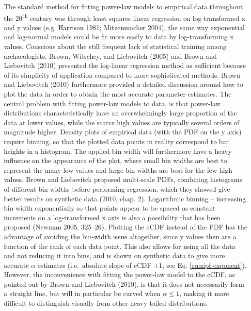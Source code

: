 \documentclass[
  12pt,
  a4paper, twoside]{book}
\begin{document}
The standard method for fitting power-law models to empirical data throughout the 20\textsuperscript{th} century was through least squares linear regression on log-transformed x and y values (e.g. Harrison 1981; Mitzenmacher 2004), the same way exponential and log-normal models could be fit more easily to data by log-transforming x values. Conscious about the still frequent lack of statistical training among archaeologists, Brown, Witschey, and Liebovitch (2005) and Brown and Liebovitch (2010) presented the log-linear regression method as sufficient because of its simplicity of application compared to more sophisticated methods. Brown and Liebovitch (2010) furthermore provided a detailed discussion around how to plot the data in order to obtain the most accurate parameter estimates. The central problem with fitting power-law models to data, is that power-law distributions characteristically have an overwhelmingly large proportion of the data at lower values, while the scarce high values are typically several orders of magnitude higher. Density plots of empirical data (with the PDF on the y axis) require binning, so that the plotted data points in reality correspond to bar heights in a histogram. The applied bin width will furthermore have a heavy influence on the appearance of the plot, where small bin widths are best to represent the many low values and large bin widths are best for the few high values. Brown and Liebovitch proposed multi-scale PDFs, combining histograms of different bin widths before performing regression, which they showed give better results on synthetic data (2010, chap. 2). Logarithmic binning -- increasing bin width exponentially so that points appear to be spaced as constant increments on a log-transformed x axis is also a possibility that has been proposed (Newman 2005, 325--26). Plotting the cCDF instead of the PDF has the advantage of avoiding the bin-width issue altogether, since y values then are a function of the rank of each data point. This also allows for using all the data and not reducing it into bins, and is shown on synthetic data to give more accurate \(\alpha\) estimates (i.e.~absolute slope of cCDF \(+ 1\), see Eq. \eqref{eq:zipf-exponent}). However, the inconvenience with fitting the power-law model to the cCDF, as pointed out by Brown and Liebovitch (2010), is that it does not necessarily form a straight line, but will in particular be curved when \(\alpha \leq 1\), making it more difficult to distinguish visually from other heavy-tailed distributions.
\end{document}
